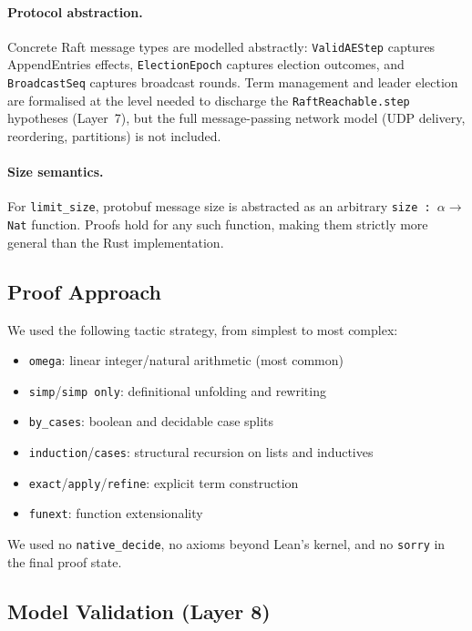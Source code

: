 \documentclass[sigconf,10pt]{acmart}
\begin{document}
\paragraph{Protocol abstraction.} Concrete Raft message types are
modelled abstractly: \texttt{ValidAEStep} captures AppendEntries effects,
\texttt{ElectionEpoch} captures election outcomes, and
\texttt{BroadcastSeq} captures broadcast rounds.  Term management and
leader election are formalised at the level needed to discharge the
\texttt{RaftReachable.step} hypotheses (Layer~7), but the full
message-passing network model (UDP delivery, reordering, partitions)
is not included.

\paragraph{Size semantics.} For \texttt{limit\_size}, protobuf message
size is abstracted as an arbitrary \texttt{size : $\alpha \to$ Nat} function.
Proofs hold for any such function, making them strictly more general than
the Rust implementation.

\subsection{Proof Approach}

We used the following tactic strategy, from simplest to most complex:

\begin{itemize}\setlength\itemsep{0pt}
  \item \texttt{omega}: linear integer/natural arithmetic (most common)
  \item \texttt{simp}/\texttt{simp only}: definitional unfolding and rewriting
  \item \texttt{by\_cases}: boolean and decidable case splits
  \item \texttt{induction}/\texttt{cases}: structural recursion on lists and inductives
  \item \texttt{exact}/\texttt{apply}/\texttt{refine}: explicit term construction
  \item \texttt{funext}: function extensionality
\end{itemize}

We used no \texttt{native\_decide}, no axioms beyond Lean's kernel, and
no \texttt{sorry} in the final proof state.

\subsection{Model Validation (Layer 8)}
\end{document}
